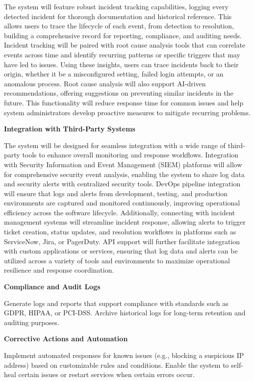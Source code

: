 The system will feature robust incident tracking capabilities, logging every detected incident for thorough documentation and historical reference. This allows users to trace the lifecycle of each event, from detection to resolution, building a comprehensive record for reporting, compliance, and auditing needs. Incident tracking will be paired with root cause analysis tools that can correlate events across time and identify recurring patterns or specific triggers that may have led to issues. Using these insights, users can trace incidents back to their origin, whether it be a misconfigured setting, failed login attempts, or an anomalous process. Root cause analysis will also support AI-driven recommendations, offering suggestions on preventing similar incidents in the future. This functionality will reduce response time for common issues and help system administrators develop proactive measures to mitigate recurring problems.

\textbf{Integration with Third-Party Systems}

The system will be designed for seamless integration with a wide range of third-party tools to enhance overall monitoring and response workflows. Integration with Security Information and Event Management (SIEM) platforms will allow for comprehensive security event analysis, enabling the system to share log data and security alerts with centralized security tools. DevOps pipeline integration will ensure that logs and alerts from development, testing, and production environments are captured and monitored continuously, improving operational efficiency across the software lifecycle. Additionally, connecting with incident management systems will streamline incident response, allowing alerts to trigger ticket creation, status updates, and resolution workflows in platforms such as ServiceNow, Jira, or PagerDuty. API support will further facilitate integration with custom applications or services, ensuring that log data and alerts can be utilized across a variety of tools and environments to maximize operational resilience and response coordination.



\textbf{Compliance and Audit Logs}

Generate logs and reports that support compliance with standards such as GDPR, HIPAA, or PCI-DSS. Archive historical logs for long-term retention and auditing purposes.

\textbf{Corrective Actions and Automation}

Implement automated responses for known issues (e.g., blocking a suspicious IP address) based on customizable rules and conditions. Enable the system to self-heal certain issues or restart services when certain errors occur.

